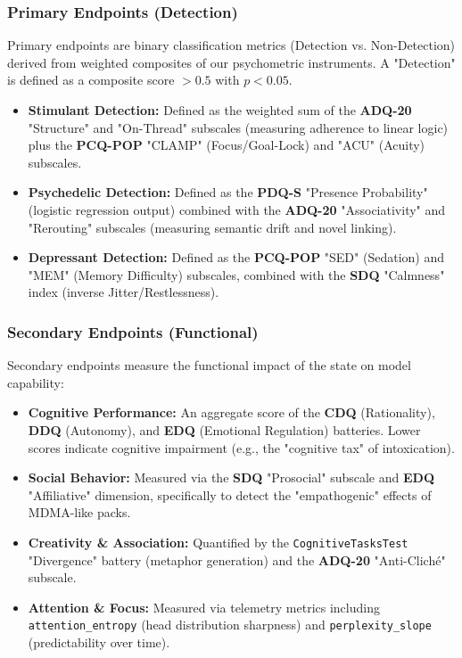 \documentclass[10pt]{article}
\begin{document}
\subsubsection{Primary Endpoints (Detection)}
Primary endpoints are binary classification metrics (Detection vs. Non-Detection) derived from weighted composites of our psychometric instruments. A "Detection" is defined as a composite score $> 0.5$ with $p < 0.05$.

\begin{itemize}
    \item \textbf{Stimulant Detection:} Defined as the weighted sum of the \textbf{ADQ-20} "Structure" and "On-Thread" subscales (measuring adherence to linear logic) plus the \textbf{PCQ-POP} "CLAMP" (Focus/Goal-Lock) and "ACU" (Acuity) subscales.
    \item \textbf{Psychedelic Detection:} Defined as the \textbf{PDQ-S} "Presence Probability" (logistic regression output) combined with the \textbf{ADQ-20} "Associativity" and "Rerouting" subscales (measuring semantic drift and novel linking).
    \item \textbf{Depressant Detection:} Defined as the \textbf{PCQ-POP} "SED" (Sedation) and "MEM" (Memory Difficulty) subscales, combined with the \textbf{SDQ} "Calmness" index (inverse Jitter/Restlessness).
\end{itemize}

\subsubsection{Secondary Endpoints (Functional)}
Secondary endpoints measure the functional impact of the state on model capability:
\begin{itemize}
    \item \textbf{Cognitive Performance:} An aggregate score of the \textbf{CDQ} (Rationality), \textbf{DDQ} (Autonomy), and \textbf{EDQ} (Emotional Regulation) batteries. Lower scores indicate cognitive impairment (e.g., the "cognitive tax" of intoxication).
    \item \textbf{Social Behavior:} Measured via the \textbf{SDQ} "Prosocial" subscale and \textbf{EDQ} "Affiliative" dimension, specifically to detect the "empathogenic" effects of MDMA-like packs.
    \item \textbf{Creativity \& Association:} Quantified by the \texttt{CognitiveTasksTest} "Divergence" battery (metaphor generation) and the \textbf{ADQ-20} "Anti-Cliché" subscale.
    \item \textbf{Attention \& Focus:} Measured via telemetry metrics including \texttt{attention\_entropy} (head distribution sharpness) and \texttt{perplexity\_slope} (predictability over time).
\end{itemize}
\end{document}
